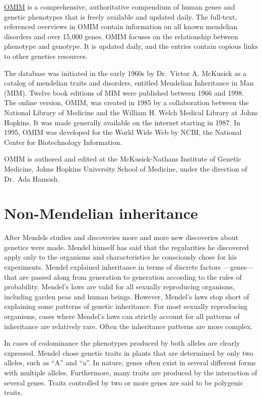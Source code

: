 \href{https://omim.org}{OMIM} is a comprehensive, authoritative compendium of human genes and genetic phenotypes that is freely available and updated daily. The full-text, referenced overviews in OMIM contain information on all known mendelian disorders and over 15,000 genes. OMIM focuses on the relationship between phenotype and genotype. It is updated daily, and the entries contain copious links to other genetics resources.

The database was initiated in the early 1960s by Dr.~Victor A. McKusick as a catalog of mendelian traits and disorders, entitled Mendelian Inheritance in Man (MIM). Twelve book editions of MIM were published between 1966 and 1998. The online version, OMIM, was created in 1985 by a collaboration between the National Library of Medicine and the William H. Welch Medical Library at Johns Hopkins. It was made generally available on the internet starting in 1987. In 1995, OMIM was developed for the World Wide Web by NCBI, the National Center for Biotechnology Information.

OMIM is authored and edited at the McKusick-Nathans Institute of Genetic Medicine, Johns Hopkins University School of Medicine, under the direction of Dr.~Ada Hamosh.

\hypertarget{non-mendelian-inheritance}{%
\section{Non-Mendelian inheritance}\label{non-mendelian-inheritance}}

After Mendels studies and discoveries more and more new discoveries about genetics were made. Mendel himself has said that the regularities he discovered apply only to the organisms and characteristics he consciously chose for his experiments. Mendel explained inheritance in terms of discrete factors ---genes--- that are passed along from generation to generation according to the rules of probability. Mendel's laws are valid for all sexually reproducing organisms, including garden peas and human beings. However, Mendel's laws stop short of explaining some patterns of genetic inheritance. For most sexually reproducing organisms, cases where Mendel's laws can strictly account for all patterns of inheritance are relatively rare. Often the inheritance patterns are more complex.

In cases of codominance the phenotypes produced by both alleles are clearly expressed. Mendel chose genetic traits in plants that are determined by only two alleles, such as ``A'' and ``a''. In nature, genes often exist in several different forms with multiple alleles. Furthermore, many traits are produced by the interaction of several genes. Traits controlled by two or more genes are said to be polygenic traits.

